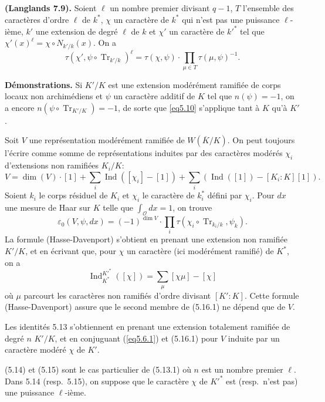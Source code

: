 \documentclass[11pt,a4paper]{amsart}
\theoremstyle{plain}
\theoremstyle{definition}
\DeclareMathOperator{\Ind}{Ind}
\DeclareMathOperator{\Tr}{Tr}
\def\dim{\mathop{\mathrm{dim}}\nolimits}
\newenvironment{para}{\par\noindent}{\par}
\newcommand{\scrO}{\mathscr{O}}
\newcommand{\ov}[1]{\overline{#1}}
\newcommand{\eps}{\varepsilon}
\begin{document}
\begin{para}\textbf{(Langlands \cite{9} 7.9).}
Soient $\ell$ un nombre premier divisant $q-1$, $T$ l'ensemble des caract\`eres d'ordre $\ell$ de $k^{*}$, $\chi$ un caract\`ere de $k^{*}$ qui n'est pas une puissance $\ell$-i\`eme, $k'$ une extension de degr\'e $\ell$ de $k$ et $\chi'$ un caract\`ere de $k'^{*}$ tel que $\chi'(x)^{\ell} = \chi \circ N_{k'/k}(x)$. On a
\[
\tau(\chi', \psi \circ \Tr_{k'/k})^{\ell} = \tau(\chi,\psi) \cdot \prod_{\mu \in T} \tau(\mu,\psi)^{-1}.
\]
\end{para}

\begin{para}\textbf{D\'emonstrations.}
Si $K'/K$ est une extension mod\'er\'ement ramifi\'ee de corps locaux non archim\'ediens et $\psi$ un caract\`ere additif de $K$ tel que $n(\psi) = -1$, on a encore $n(\psi \circ \Tr_{K'/K}) = -1$, de sorte que \ref{eq5.10} s'applique tant \`a $K$ qu'\`a $K'$.

Soit $V$ une repr\'esentation mod\'er\'ement ramifi\'ee de $W(\ov{K}/K)$. On peut toujours l'\'ecrire comme somme de repr\'esentations induites par des caract\`eres mod\'er\'es $\chi_{i}$ d'extensions non ramifi\'ees $K_{i}/K$:
\[
V = \dim(V) \cdot [1] + \sum_{i} \Ind([\chi_{i}] - [1]) + \sum_{i} (\Ind([1]) - [K_{i}:K][1]).
\]
Soient $k_{i}$ le corps r\'esiduel de $K_{i}$ et $\chi_{i}$ le caract\`ere de $k_{i}^{*}$ d\'efini par $\chi_{i}$. Pour $dx$ une mesure de Haar sur $K$ telle que $\int_{\scrO} dx = 1$, on trouve
\begin{equation}
\eps_{0}(V,\psi,dx) = (-1)^{\dim V} \cdot \prod_{i} \tau(\chi_{i} \circ \Tr_{k_{i}/k}, \psi_{k}).
\end{equation}
La formule (Hasse-Davenport) s'obtient en prenant une extension non ramifi\'ee $K'/K$, et en \'ecrivant que, pour $\chi$ un caract\`ere (ici mod\'er\'ement ramifi\'e) de $K^{*}$, on a
\[
\Ind_{K^{*}}^{K'^{*}}([\chi]) = \sum_{\mu} [\chi\mu] - [\chi]
\]
o\`u $\mu$ parcourt les caract\`eres non ramifi\'es d'ordre divisant $[K':K]$. Cette formule (Hasse-Davenport) assure que le second membre de (5.16.1) ne d\'epend que de $V$.

Les identit\'es 5.13 s'obtiennent en prenant une extension totalement ramifi\'ee de degr\'e $n$ $K'/K$, et en conjuguant (\ref{eq5.6.1}) et (5.16.1) pour $V$ induite par un caract\`ere mod\'er\'e $\chi$ de $K'$.

(5.14) et (5.15) sont le cas particulier de (5.13.1) o\`u $n$ est un nombre premier $\ell$. Dans 5.14 (resp.~5.15), on suppose que le caract\`ere $\chi$ de $K'^{*}$ est (resp.~n'est pas) une puissance $\ell$-i\`eme.
\end{para}
\end{document}
